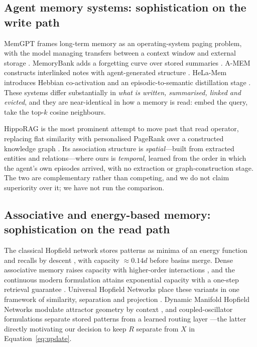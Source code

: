 \label{sec:related}

\subsection{Agent memory systems: sophistication on the write path}

MemGPT frames long-term memory as an operating-system paging problem, with the model managing
transfers between a context window and external storage \citep{packer2023memgpt}. MemoryBank
adds a forgetting curve over stored summaries \citep{zhong2024memorybank}. A-MEM constructs
interlinked notes with agent-generated structure \citep{xu2025amem}. HeLa-Mem introduces
Hebbian co-activation and an episodic-to-semantic distillation stage \citep{zhu2026helamem}.
These systems differ substantially in \emph{what is written, summarised, linked and evicted},
and they are near-identical in how a memory is read: embed the query, take the top-$k$
cosine neighbours.

HippoRAG is the most prominent attempt to move past that read operator, replacing flat
similarity with personalised PageRank over a constructed knowledge graph
\citep{gutierrez2024hipporag}. Its association structure is \emph{spatial}---built from
extracted entities and relations---where ours is \emph{temporal}, learned from the order in
which the agent's own episodes arrived, with no extraction or graph-construction stage. The
two are complementary rather than competing, and we do not claim superiority over it; we
have not run the comparison.

\subsection{Associative and energy-based memory: sophistication on the read path}

The classical Hopfield network stores patterns as minima of an energy function and recalls by
descent \citep{hopfield1982}, with capacity ${\approx}0.14d$ before basins merge. Dense
associative memory raises capacity with higher-order interactions
\citep{krotov2016dense}, and the continuous modern formulation attains exponential capacity
with a one-step retrieval guarantee \citep{ramsauer2021hopfield}. Universal Hopfield Networks
place these variants in one framework of similarity, separation and projection
\citep{millidge2022universal}. Dynamic Manifold Hopfield Networks modulate attractor geometry
by context \citep{li2025dmhn}, and coupled-oscillator formulations separate stored patterns
from a learned routing layer \citep{guo2026oscillator}---the latter directly motivating our
decision to keep $R$ separate from $X$ in Equation~\eqref{eq:update}.


